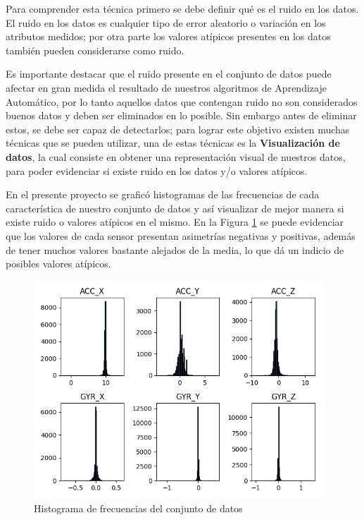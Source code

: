 Para comprender esta t\'{e}cnica primero se debe definir qu\'{e} es el ruido en los datos. El ruido en los datos es cualquier tipo de error aleatorio o variaci\'{o}n en los atributos medidos; por otra parte los valores at\'{i}picos presentes en los datos tambi\'{e}n pueden considerarse como ruido. 

\vspace{5mm} %

Es importante destacar que el ruido presente en el conjunto de datos puede afectar en gran medida el resultado de nuestros algoritmos de Aprendizaje Autom\'{a}tico, por lo tanto aquellos datos que contengan ruido no son considerados buenos datos y deben ser eliminados en lo posible. Sin embargo antes de eliminar estos, se debe ser capaz de detectarlos; para lograr este objetivo existen muchas t\'{e}cnicas que se pueden utilizar, una de estas t\'{e}cnicas es la \textbf{Visualizaci\'{o}n de datos}, la cual consiste en obtener una representaci\'{o}n visual de nuestros datos, para poder evidenciar si existe ruido en los datos y/o valores at\'{i}picos.

\vspace{5mm} %

En el presente proyecto se grafic\'{o} histogramas de las frecuencias de cada caracter\'{i}stica de nuestro conjunto de datos y as\'{i} visualizar de mejor manera si existe ruido o valores at\'{i}picos en el mismo. En la Figura \ref{fig:hist} se puede evidenciar que los valores de cada sensor presentan asimetr\'{i}as negativas y positivas, adem\'{a}s de tener muchos valores bastante alejados de la media, lo que d\'{a} un indicio de posibles valores at\'{i}picos.

\begin{figure}[h!]
  \begin{center}	\includegraphics[width=0.97\textwidth]{imagenes/Cap3/histograma_sensores}
  \caption{Histograma de frecuencias del conjunto de datos}
  \label{fig:hist}
  \end{center}
\end{figure}

